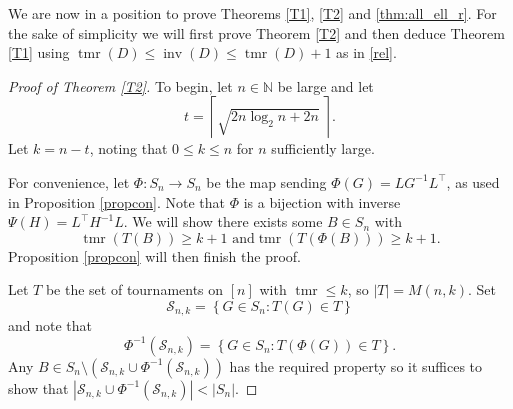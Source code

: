 \documentclass[10pt,a4paper]{amsart}
\numberwithin{equation}{section}
\theoremstyle{plain}
\theoremstyle{remark}
\theoremstyle{definition}
\newcommand{\tmr}{\operatorname{tmr}}
\newcommand{\inv}{\operatorname{inv}}
\begin{document}
We are now in a position to prove Theorems \ref{T1}, \ref{T2} and \ref{thm:all_ell_r}. For the sake of simplicity we will first prove Theorem \ref{T2} and then deduce Theorem \ref{T1} using $\tmr(D) \leq \inv(D) \leq \tmr(D)+1$ as in \eqref{rel}.
\medskip
\begin{proof}[Proof of Theorem \ref{T2}]
    To begin, let $n \in \mathbb{N}$ be large and let 
      \begin{equation*}
        t=  \left \lceil \sqrt{2n\log_2 n+2n}~ \right \rceil.
      \end{equation*}
    Let $k = n-t$, 
    noting that $ 0 \leq k \le n$ for $n$ sufficiently large. 
    
    For convenience, let $\Phi : S_n \to S_n$ be the map sending $\Phi(G) = LG^{-1}L^{\top}$, as used in Proposition \ref{propcon}. Note that $\Phi$ is a bijection with inverse $\Psi(H) = L^{\top} H^{-1} L$.
    We will show there exists some $B \in S_n$ with 
    \begin{equation*}
        \tmr(T(B)) \geq k+1 \text{ and} \tmr(T(\Phi(B))) \geq k+1.
    \end{equation*}
    Proposition \ref{propcon} will then finish the proof. 
  
    Let $T$ be the set of tournaments on $[n]$ with $\tmr \leq k$, so $|T| = M(n,k)$. Set
    \begin{equation*}
        \mathcal{S}_{n, k} = \left\{ G \in S_n : T(G) \in T \right\}
    \end{equation*}
    and note that 
    \[
     \Phi^{-1}(\mathcal{S}_{n, k}) = \left\{ G \in S_n : T(\Phi(G)) \in T \right\}.
    \]
    Any $B \in S_n \setminus ({\mathcal{S}_{n, k} \cup \Phi^{-1}(\mathcal{S}_{n, k})} )$ has the required property so it suffices to show that $ |{{\mathcal{S}_{n, k} \cup \Phi^{-1}(\mathcal{S}_{n, k})}}|< |S_n|$. 
    

\end{proof}
\end{document}
